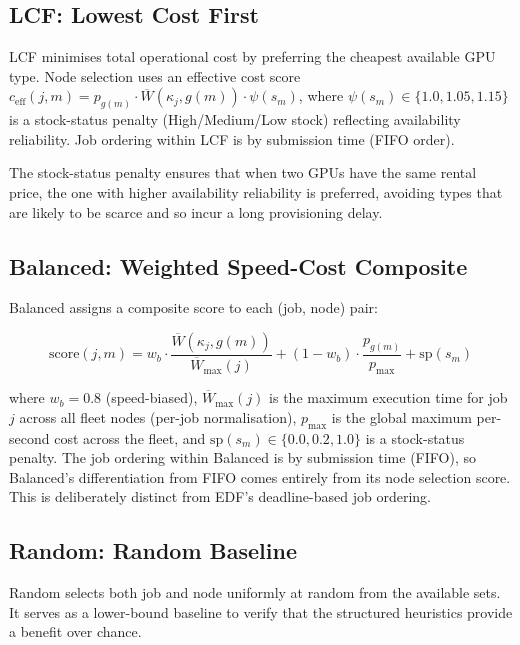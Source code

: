 \subsection{LCF: Lowest Cost First}
\label{ssec:lcf-lowest-cost-first}

LCF minimises total operational cost by preferring the cheapest available GPU type. Node selection uses an effective cost score $c_{\text{eff}}(j,m) = p_{g(m)} \cdot \overline{W}(\kappa_j, g(m)) \cdot \psi(s_m)$, where $\psi(s_m) \in \{1.0, 1.05, 1.15\}$ is a stock-status penalty (High/Medium/Low stock) reflecting availability reliability. Job ordering within LCF is by submission time (FIFO order).

The stock-status penalty ensures that when two GPUs have the same rental price, the one with higher availability reliability is preferred, avoiding types that are likely to be scarce and so incur a long provisioning delay.

\subsection{Balanced: Weighted Speed-Cost Composite}
\label{ssec:balanced-weighted-speed-cost-composite}

Balanced assigns a composite score to each (job, node) pair:

\begin{equation}
\text{score}(j, m) = w_b \cdot \frac{\overline{W}(\kappa_j, g(m))}{\overline{W}_{\max}(j)} + (1-w_b) \cdot \frac{p_{g(m)}}{p_{\max}} + \text{sp}(s_m)
\label{eq:balanced_score}
\end{equation}

where $w_b = 0.8$ (speed-biased), $\overline{W}_{\max}(j)$ is the maximum execution time for job $j$ across all fleet nodes (per-job normalisation), $p_{\max}$ is the global maximum per-second cost across the fleet, and $\text{sp}(s_m) \in \{0.0, 0.2, 1.0\}$ is a stock-status penalty. The job ordering within Balanced is by submission time (FIFO), so Balanced's differentiation from FIFO comes entirely from its node selection score. This is deliberately distinct from EDF's deadline-based job ordering.

\subsection{Random: Random Baseline}
\label{ssec:random-random-baseline}

Random selects both job and node uniformly at random from the available sets. It serves as a lower-bound baseline to verify that the structured heuristics provide a benefit over chance.


